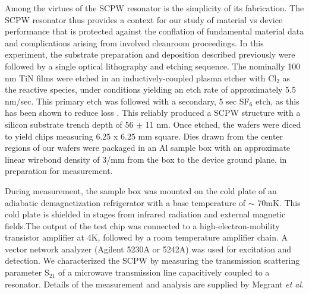Among the virtues of the SCPW resonator is the simplicity of its fabrication.  The SCPW resonator thus provides a context for our study of material vs device performance that is protected against the conflation of fundamental material data and complications arising from involved cleanroom proceedings.  In this experiment, the substrate preparation and deposition described previously were followed by a single optical lithography and etching sequence. The nominally 100 nm TiN films were etched in an inductively-coupled plasma etcher with Cl$_{2} $ as the reactive species, under conditions yielding an etch rate of approximately 5.5 nm/sec.  This primary etch was followed with a secondary, 5 sec SF$_{6}$ etch, as this has been shown to reduce loss \cite{Sandberg2012}.  This reliably produced a SCPW structure with a silicon substrate trench depth of 56 $\pm$ 11 nm.  Once etched, the wafers were diced to yield chips measuring 6.25 x 6.25 mm square.  Dies drawn from the center regions of our wafers were packaged in an Al sample box with an approximate linear wirebond density of 3/mm from the box to the device ground plane, in preparation for measurement.

During measurement, the sample box was mounted on the cold plate of an adiabatic demagnetization refrigerator with a base temperature of $\sim$ 70mK.  This cold plate is shielded in stages from infrared radiation and external magnetic fields.\cite{Barends2011}The output of the test chip was connected to a high-electron-mobility transistor amplifier at 4K, followed by a room temperature amplifier chain. A vector network analyzer (Agilent 5230A or 5242A) was used for excitation and detection.  We characterized the SCPW by measuring the transmission scattering parameter S$_{21}$ of a microwave transmission line capacitively coupled to a resonator.  Details of the measurement and analysis are supplied by Megrant \textit{et al}. \cite{Megrant2012}

